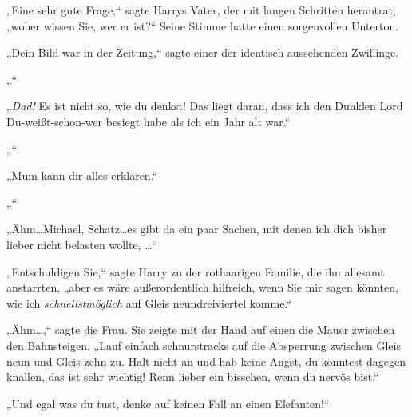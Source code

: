 „Eine sehr gute Frage,“ sagte Harrys Vater, der mit langen Schritten herantrat, „woher wissen Sie, wer er ist?“ Seine Stimme hatte einen sorgenvollen Unterton.

„Dein Bild war in der Zeitung,“ sagte einer der identisch aussehenden Zwillinge.

„“

„\emph{Dad!} Es ist nicht so, wie du denkst! Das liegt daran, dass ich den Dunklen Lord Du-weißt-schon-wer besiegt habe als ich ein Jahr alt war.“

„“

„Mum kann dir alles erklären.“

„“

„Ähm…Michael, Schatz…es gibt da ein paar Sachen, mit denen ich dich bisher lieber nicht belasten wollte, …“

„Entschuldigen Sie,“ sagte Harry zu der rothaarigen Familie, die ihn allesamt anstarrten, „aber es wäre außerordentlich hilfreich, wenn Sie mir sagen könnten, wie ich \emph{schnellstmöglich} auf Gleis neundreiviertel komme.“

„Ähm…,“ sagte die Frau. Sie zeigte mit der Hand auf einen die Mauer zwischen den Bahnsteigen. „Lauf einfach schnurstracks auf die Absperrung zwischen Gleis neun und Gleis zehn zu. Halt nicht an und hab keine Angst, du könntest dagegen knallen, das ist sehr wichtig! Renn lieber ein bisschen, wenn du nervös bist.“

„Und egal was du tust, denke auf keinen Fall an einen Elefanten!“


